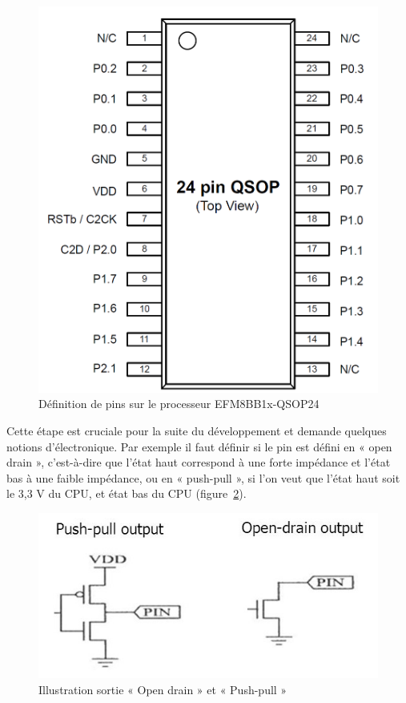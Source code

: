 \documentclass[a4paper, 11pt]{report}
\begin{document}
\begin{figure}[!h]
\begin{center}
\includegraphics[scale=0.4]{figures/screenshots/pins_definition_EFM8BB.png}
\end{center}
\caption{Définition de pins sur le processeur EFM8BB1x-QSOP24\cite{EFM8BB1_datasheet}}
\label{fig:pins_definition}
\end{figure}

Cette étape est cruciale pour la suite du développement et demande quelques notions d’électronique. Par exemple il faut définir si le pin est défini en « open drain », c’est-à-dire que l’état haut correspond à une forte impédance et l’état bas à une faible impédance, ou en « push-pull », si l’on veut que l’état haut soit le 3,3 V du CPU, et état bas du CPU (figure~\ref{fig:opendrain_pushpull}). 

\begin{figure}[!h]
\begin{center}
\includegraphics[scale=0.55]{figures/screenshots/opendrain_pushpull.png}
\end{center}
\caption{Illustration sortie « Open drain » et « Push-pull »} 
\label{fig:opendrain_pushpull}
\end{figure}
\end{document}
